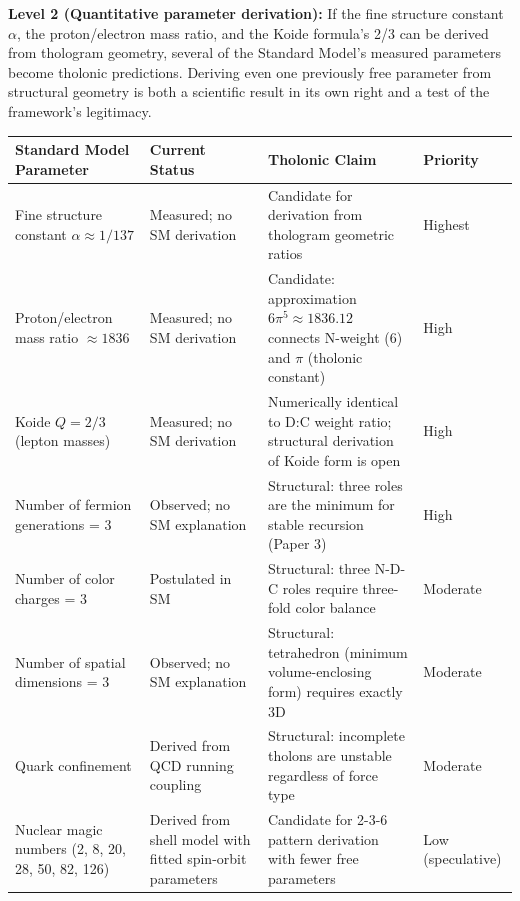 \documentclass[
  11pt,
  letterpaper,
]{article}
\begin{document}
\textbf{Level 2 (Quantitative parameter derivation):} If the fine
structure constant \(\alpha\), the proton/electron mass ratio, and the
Koide formula's 2/3 can be derived from thologram geometry, several of
the Standard Model's measured parameters become tholonic predictions.
Deriving even one previously free parameter from structural geometry is
both a scientific result in its own right and a test of the framework's
legitimacy.

\begin{longtable}[]{@{}
  >{\raggedright\arraybackslash}p{}
  >{\raggedright\arraybackslash}p{}
  >{\raggedright\arraybackslash}p{}
  >{\raggedright\arraybackslash}p{}@{}}
\toprule\noalign{}
\begin{minipage}[b]{\linewidth}\raggedright
Standard Model Parameter
\end{minipage} & \begin{minipage}[b]{\linewidth}\raggedright
Current Status
\end{minipage} & \begin{minipage}[b]{\linewidth}\raggedright
Tholonic Claim
\end{minipage} & \begin{minipage}[b]{\linewidth}\raggedright
Priority
\end{minipage} \\
\midrule\noalign{}
\endhead
\bottomrule\noalign{}
\endlastfoot
Fine structure constant \(\alpha \approx 1/137\) & Measured; no SM
derivation & Candidate for derivation from thologram geometric ratios &
Highest \\
Proton/electron mass ratio \(\approx 1836\) & Measured; no SM derivation
& Candidate: approximation \(6\pi^5 \approx 1836.12\) connects N-weight
(6) and \(\pi\) (tholonic constant) & High \\
Koide \(Q = 2/3\) (lepton masses) & Measured; no SM derivation &
Numerically identical to D:C weight ratio; structural derivation of
Koide form is open & High \\
Number of fermion generations = 3 & Observed; no SM explanation &
Structural: three roles are the minimum for stable recursion (Paper 3) &
High \\
Number of color charges = 3 & Postulated in SM & Structural: three N-D-C
roles require three-fold color balance & Moderate \\
Number of spatial dimensions = 3 & Observed; no SM explanation &
Structural: tetrahedron (minimum volume-enclosing form) requires exactly
3D & Moderate \\
Quark confinement & Derived from QCD running coupling & Structural:
incomplete tholons are unstable regardless of force type & Moderate \\
Nuclear magic numbers (2, 8, 20, 28, 50, 82, 126) & Derived from shell
model with fitted spin-orbit parameters & Candidate for 2-3-6 pattern
derivation with fewer free parameters & Low (speculative) \\
\end{longtable}
\end{document}

